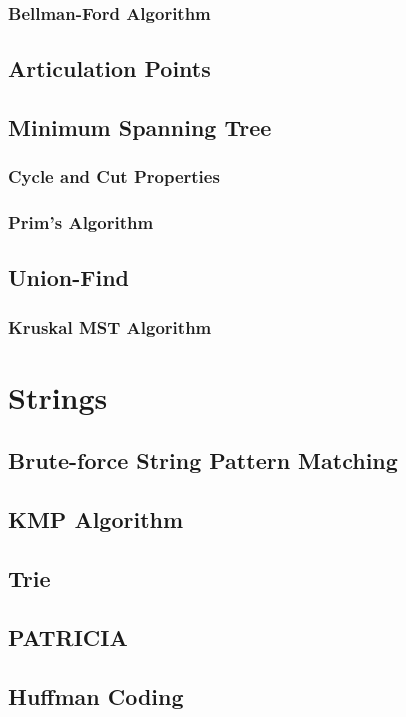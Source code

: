 \documentclass{report}
\begin{document}
\subsection{Bellman-Ford Algorithm}

\section{Articulation Points}

\section{Minimum Spanning Tree}

\subsection{Cycle and Cut Properties}

\subsection{Prim's Algorithm}

\section{Union-Find}

\subsection{Kruskal MST Algorithm}


\chapter{Strings}

\section{Brute-force String Pattern Matching}

\section{KMP Algorithm}

\section{Trie}

\section{PATRICIA}

\section{Huffman Coding}
\end{document}
